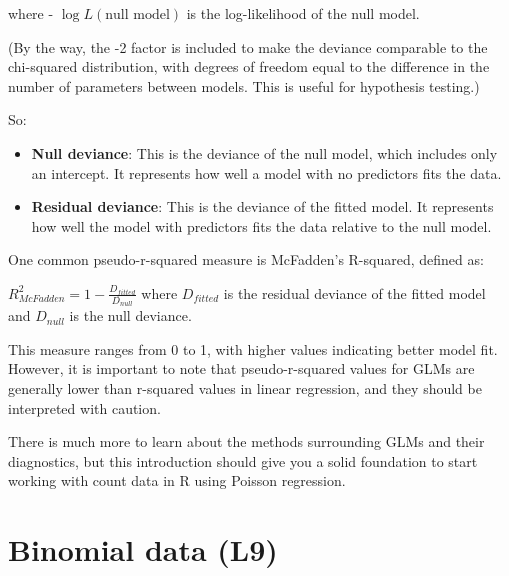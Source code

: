 \documentclass[
  letterpaper,
  8pt,
  a4paper]{book}
\providecommand{\tightlist}{%
  \setlength{\itemsep}{0pt}\setlength{\parskip}{0pt}}
\begin{document}
where - \(\log L(\text{null model})\) is the log-likelihood of the null
model.

(By the way, the -2 factor is included to make the deviance comparable
to the chi-squared distribution, with degrees of freedom equal to the
difference in the number of parameters between models. This is useful
for hypothesis testing.)

So:

\begin{itemize}
\tightlist
\item
  \textbf{Null deviance}: This is the deviance of the null model, which
  includes only an intercept. It represents how well a model with no
  predictors fits the data.
\item
  \textbf{Residual deviance}: This is the deviance of the fitted model.
  It represents how well the model with predictors fits the data
  relative to the null model.
\end{itemize}

One common pseudo-r-squared measure is McFadden's R-squared, defined as:

\(R^2_{McFadden} = 1 - \frac{D_{fitted}}{D_{null}}\) where
\(D_{fitted}\) is the residual deviance of the fitted model and
\(D_{null}\) is the null deviance.

This measure ranges from 0 to 1, with higher values indicating better
model fit. However, it is important to note that pseudo-r-squared values
for GLMs are generally lower than r-squared values in linear regression,
and they should be interpreted with caution.

There is much more to learn about the methods surrounding GLMs and their
diagnostics, but this introduction should give you a solid foundation to
start working with count data in R using Poisson regression.


\chapter*{Binomial data (L9)}\label{binomial-data-l9}

\end{document}
